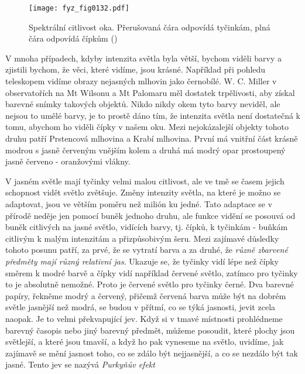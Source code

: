     \begin{figure}[ht!]  %
      \centering
      \texttt{[image: fyz\_fig0132.pdf]}
      \caption{Spektrální citlivost oka. Přerušovaná čára odpovídá tyčinkám, plná čára odpovídá 
               čípkům
               (\cite[s.~470]{Feynman01})}
      \label{fyz:fig0132}
    \end{figure}
    V mnoha případech, kdyby intenzita světla byla větší, bychom viděli barvy a zjistili bychom, že 
    věci, které vidíme, jsou krásné. Například při pohledu teleskopem vidíme obrazy nejasných 
    mlhovin jako černobílé. W. C. Miller v observatořích na Mt Wilsonu a Mt Palomaru měl dostatek 
    trpělivosti, aby získal barevné snímky takových objektů. Nikdo nikdy okem tyto barvy neviděl, 
    ale nejsou to umělé barvy, je to prostě dáno tím, že intenzita světla není dostatečná k tomu, 
    abychom ho viděli čípky v našem oku. Mezi nejokázalejší objekty tohoto druhu patří Prstencová 
    mlhovina a Krabí mlhovina. První má vnitřní část krásně modrou s jasně červeným vnějším kolem a 
    druhá má modrý opar prostoupený jasně červeno - oranžovými vlákny.
    
    V jasném světle mají tyčinky velmi malou citlivost, ale ve tmě se časem jejich schopnost vidět
    světlo zvětšuje. Změny intenzity světla, na které je možno se adaptovat, jsou ve větším poměru
    než milión ku jedné. Tato adaptace se v přírodě neděje jen pomocí buněk jednoho druhu, ale
    funkce vidění se posouvá od buněk citlivých na jasné světlo, vidících barvy, tj. čípků, k
    tyčinkám - buňkám citlivým k malým intenzitám a přizpůsobivým šeru. Mezi zajímavé důsledky
    tohoto posunu patří, za prvé, že se vytratí barva a za druhé, že \emph{různě zbarvené předměty
    mají různý relativní jas}. Ukazuje se, že tyčinky vidí lépe než čípky směrem k modré barvě a
    čípky vidí například červené světlo, zatímco pro tyčinky to je absolutně nemožné. Proto je
    červené světlo pro tyčinky černé. Dva barevné papíry, řekněme modrý a červený, přičemž červená
    barva může být na dobrém světle jasnější než modrá, se budou v přítmí, co se týká jasnosti,
    jevit zcela naopak. Je to velmi překvapující jev. Když si v tmavé místnosti prohlédneme barevný
    časopis nebo jiný barevný předmět, můžeme posoudit, které plochy jsou světlejší, a které jsou
    tmavší, a když ho pak vyneseme na světlo, uvidíme, jak zajímavě se mění jasnost toho, co se
    zdálo být nejjasnější, a co se nezdálo být tak jasné. Tento jev se nazývá \emph{Purkyňův efekt}
    
